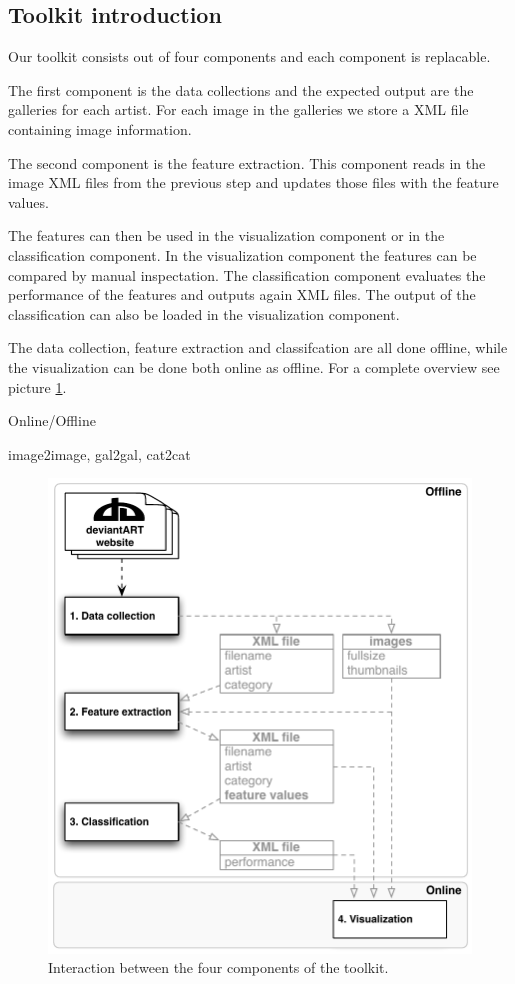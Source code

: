 \subsection{Toolkit introduction}
Our toolkit consists out of four components and each component is replacable.

The first component is the data collections and the expected output are the galleries
for each artist. For each image in the galleries we store a XML file containing image information.

The second component is the feature extraction. This component reads in the image XML files from 
the previous step and updates those files with the feature values.

The features can then be used in the visualization component or in the classification component.
In the visualization component the features can be compared by manual inspectation. The classification
component evaluates the performance of the features and outputs again XML files. The output of the
classification can also be loaded in the visualization component.

The data collection, feature extraction and classifcation are all done offline, while the visualization 
can be done both online as offline. For a complete overview see picture \ref{fig:components}.

Online/Offline

image2image, gal2gal, cat2cat

\begin{figure}[htb]
  \centering
  \includegraphics[width=1\linewidth]{img/components.pdf}
  \caption{Interaction between the four components of the toolkit.}
  \label{fig:components}
\end{figure}

